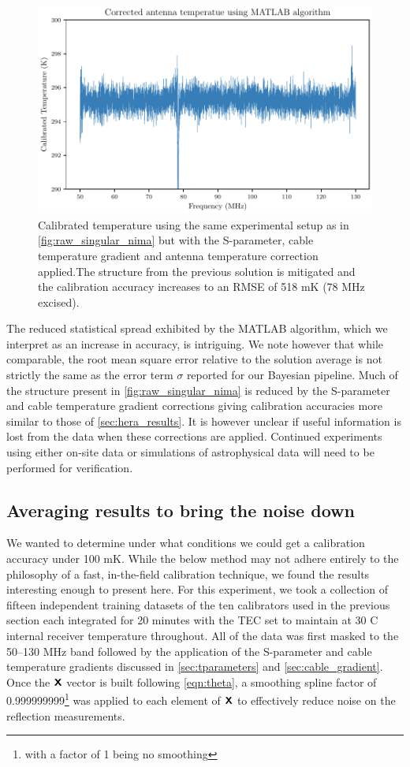 \begin{figure}
    \centering
    \includegraphics[width=.8\textwidth]{corrected_matlab_solution}
    \caption{Calibrated temperature using the same experimental setup as in \cref{fig:raw_singular_nima} but with the S-parameter, cable temperature gradient and antenna temperature correction applied.The structure from the previous solution is mitigated and the calibration accuracy increases to an RMSE of 518 mK (78 MHz excised).}
    \label{fig:corrected_singular_nima}
\end{figure}

The reduced statistical spread exhibited by the MATLAB algorithm, which we interpret as an increase in accuracy, is intriguing. We note however that while comparable, the root mean square error relative to the solution average is not strictly the same as the error term $\sigma$ reported for our Bayesian pipeline. Much of the structure present in \cref{fig:raw_singular_nima} is reduced by the S-parameter and cable temperature gradient corrections giving calibration accuracies more similar to those of \cref{sec:hera_results}. It is however unclear if useful information is lost from the data when these corrections are applied. Continued experiments using either on-site data or simulations of astrophysical data will need to be performed for verification.

\subsection{Averaging results to bring the noise down}\label{sec:matlab_avg_results}
We wanted to determine under what conditions we could get a calibration accuracy under 100 mK. While the below method may not adhere entirely to the philosophy of a fast, in-the-field calibration technique, we found the results interesting enough to present here. For this experiment, we took a collection of fifteen independent training datasets of the ten calibrators used in the previous section each integrated for 20 minutes with the TEC set to maintain at 30 \textdegree C internal receiver temperature throughout. All of the data was first masked to the 50--130 MHz band followed by the application of the S-parameter and cable temperature gradients discussed in \cref{sec:tparameters} and \cref{sec:cable_gradient}. Once the $\textbf{\textsf{X}}$ vector is built following \cref{eqn:theta}, a smoothing spline factor of 0.999999999\footnote{with a factor of 1 being no smoothing} was applied to each element of $\textbf{\textsf{X}}$ to effectively reduce noise on the reflection measurements.

